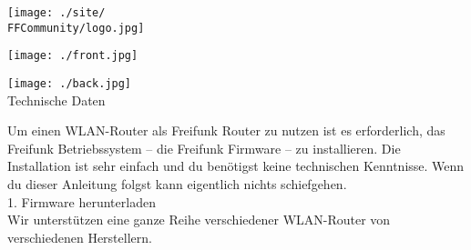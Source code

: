 \documentclass[11pt, a4paper,ngerman]{article}
\begin{document}


\begin{center}


\texttt{[image: ./site/\\FFCommunity/logo.jpg]}\\


\vspace{0.3cm}

\texttt{[image: ./front.jpg]}\\

\routername

\end{center}
\newpage

\begin{center}
\texttt{[image: ./back.jpg]}\\
\Huge{Technische Daten}\\
\end{center}







Um einen WLAN-Router als Freifunk Router zu nutzen ist es erforderlich, das Freifunk Betriebssystem – die Freifunk Firmware – zu installieren. Die Installation ist sehr einfach und du benötigst keine technischen Kenntnisse. Wenn du dieser Anleitung folgst kann eigentlich nichts schiefgehen.\\

{\Large 1. Firmware herunterladen} \\

Wir unterstützen eine ganze Reihe verschiedener WLAN-Router von verschiedenen Herstellern. 
\end{document}
